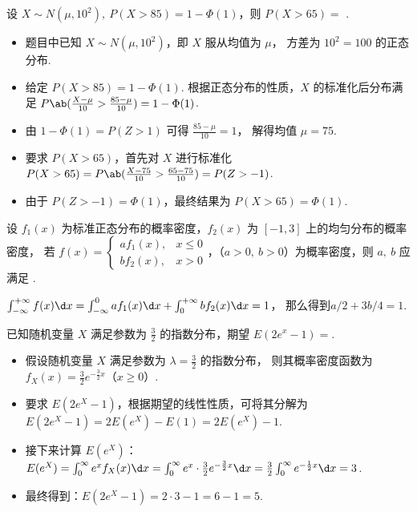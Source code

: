 \begin{problem}
  设 $X \sim N(\mu,10^2),~ P(X > 85) = 1 - \Phi(1)$，则 $P(X > 65) = $
  .
\end{problem}
\scratch[8ex]
\begin{solution}\leavevmode
  \begin{itemize}
    \item 题目中已知 $X \sim N(\mu,10^2)$，即 $X$ 服从均值为 $\mu$，
    方差为 $10^2 = 100$ 的正态分布.
    \item 给定 $P(X > 85) = 1 - \Phi(1)$. 根据正态分布的性质，$X$ 的标准化后分布满足
    $P\ab(\frac{X - \mu}{10} > \frac{85 - \mu}{10}) = 1 - \Phi(1)$.
    \item 由 $1 - \Phi(1) = P(Z > 1)$ 可得 $\frac{85 - \mu}{10} = 1$，
    解得均值 $\mu = 75$.
    \item 要求 $P(X > 65)$，首先对 $X$ 进行标准化
    $P(X > 65) = P\ab(\frac{X - 75}{10} > \frac{65 - 75}{10}) = P(Z > -1)$.
    \item 由于 $P(Z > -1) = \Phi(1)$，最终结果为 $P(X > 65) = \Phi(1)$.
  \end{itemize}
\end{solution}

\begin{problem}[2010年全国考研题]
  设 $f_1(x)$ 为标准正态分布的概率密度，$f_2(x)$ 为 $[-1,3]$ 上的均匀分布的概率密度，
  若 $f(x) =
  \begin{cases}
    af_1(x), & x \leq 0\\
    bf_2(x), & x > 0
  \end{cases}$，（$a > 0,~ b > 0$）为概率密度，则 $a,~ b$ 应满足
  .
\end{problem}
\scratch[4ex]
\begin{solution}
  $ \int_{-\infty}^{+\infty} f(x) \d x = \int_{-\infty}^0 af_1(x) \d x +
    \int_0^{+\infty} bf_2(x) \d x = 1$，
  那么得到$a/2 + 3b/4 = 1$.
\end{solution}

\begin{problem}
  已知随机变量 $X$ 满足参数为 $\frac32$ 的指数分布，期望 $E(2e^x - 1) = $.
\end{problem}
\scratch[8ex]
\begin{solution}\leavevmode
  \begin{itemize}
    \item 假设随机变量 $X$ 满足参数为 $\lambda = \frac32$ 的指数分布，
    则其概率密度函数为 $f_X(x) = \frac32 e^{-\frac32 x}$（$x \geq 0$）.
    \item 要求 $E(2e^X - 1)$，根据期望的线性性质，可将其分解为
    $E(2e^X - 1) = 2E(e^X) - E(1) = 2E(e^X) - 1$.
    \item 接下来计算 $E(e^X)$：
    $E(e^X) = \int_0^{\infty} e^x f_X(x) \d x
            = \int_0^{\infty} e^x \cdot \frac32 e^{-\frac32x} \d x
            = \frac32 \int_0^{\infty} e^{-\frac12x} \d x = 3$.
    \item 最终得到：$E(2e^X - 1) = 2 \cdot 3 - 1 = 6 - 1 = 5$.
  \end{itemize}
\end{solution}

